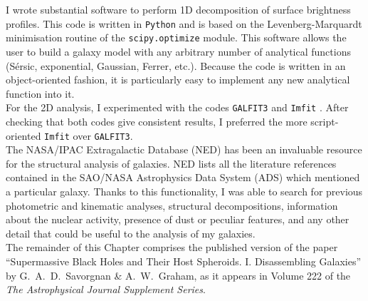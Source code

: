 I wrote substantial software to perform 1D decomposition of surface brightness profiles. 
This code is written in {\tt Python} and is based on the Levenberg-Marquardt minimisation routine 
of the {\tt scipy.optimize} module. 
This software allows the user to build a galaxy model with any arbitrary number of analytical functions 
(S\'ersic, exponential, Gaussian, Ferrer, etc.). 
Because the code is written in an object-oriented fashion, 
it is particularly easy to implement any new analytical function into it. \\ 

For the 2D analysis, I experimented with the codes {\tt GALFIT3} \citep{peng2010} 
and {\tt Imfit} \citep{imfit}. 
After checking that both codes give consistent results, 
I preferred the more script-oriented {\tt Imfit} over {\tt GALFIT3}. \\ 

The NASA/IPAC Extragalactic Database (NED) has been an invaluable resource 
for the structural analysis of galaxies. 
NED lists all the literature references contained in the SAO/NASA Astrophysics Data System (ADS) 
which mentioned a particular galaxy. 
Thanks to this functionality, 
I was able to search for previous photometric and kinematic analyses, 
structural decompositions, information about the nuclear activity, 
presence of dust or peculiar features, 
and any other detail that could be useful to the analysis of my galaxies. \\

The remainder of this Chapter comprises the published version of the paper 
``Supermassive Black Holes and Their Host Spheroids. I. Disassembling Galaxies'' 
by G.~A.~D.~Savorgnan \& A.~W.~Graham,  
as it appears in Volume 222 of the \emph{The Astrophysical Journal Supplement Series}. 



